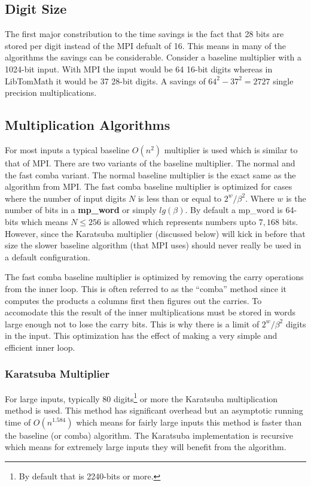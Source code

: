 \documentclass[]{article}
\begin{document}
\subsection{Digit Size}
The first major constribution to the time savings is the fact that 28 bits are stored per digit instead of the MPI 
defualt of 16.  This means in many of the algorithms the savings can be considerable.  Consider a baseline multiplier 
with a 1024-bit input.  With MPI the input would be 64 16-bit digits whereas in LibTomMath it would be 37 28-bit digits.
A savings of $64^2 - 37^2 = 2727$ single precision multiplications.  

\subsection{Multiplication Algorithms}
For most inputs a typical baseline $O(n^2)$ multiplier is used which is similar to that of MPI.  There are two variants 
of the baseline multiplier.  The normal and the fast comba variant.  The normal baseline multiplier is the exact same as 
the algorithm from MPI.  The fast comba baseline multiplier is optimized for cases where the number of input digits $N$ 
is less than or equal to $2^{w}/\beta^2$.  Where $w$ is the number of bits in a \textbf{mp\_word} or simply $lg(\beta)$.
By default a mp\_word is 64-bits which means $N \le 256$ is allowed which represents numbers upto $7,168$ bits.  However,
since the Karatsuba multiplier (discussed below) will kick in before that size the slower baseline algorithm (that MPI
uses) should never really be used in a default configuration.  

The fast comba baseline multiplier is optimized by removing the carry operations from the inner loop.  This is often 
referred to as the ``comba'' method since it computes the products a columns first then figures out the carries.  To
accomodate this the result of the inner multiplications must be stored in words large enough not to lose the carry bits.  
This is why there is a limit of $2^{w}/\beta^2$ digits in the input.  This optimization has the effect of making a 
very simple and efficient inner loop.

\subsubsection{Karatsuba Multiplier}
For large inputs, typically 80 digits\footnote{By default that is 2240-bits or more.} or more the Karatsuba multiplication
method is used.  This method has significant overhead but an asymptotic running time of $O(n^{1.584})$ which means for 
fairly large inputs this method is faster than the baseline (or comba) algorithm.  The Karatsuba implementation is 
recursive which means for extremely large inputs they will benefit from the algorithm.
\end{document}
